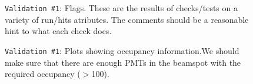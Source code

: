 \documentclass[12pt]{article}
\begin{document}
\begin{figure}
\centering
\noindent{}
  \caption{\centering \texttt{Validation \#1}: Flags. These are the results of checks/tests on a variety of run/hits atributes. The comments should be a reasonable hint to what each check does.}
  \label{fig:val7}
\end{figure}

\begin{figure}
\centering
\noindent{}
  \caption{\centering \texttt{Validation \#1}: Plots showing occupancy information.\hspace{\textwidth}We should make sure that there are enough PMTs in the beamspot with the required occupancy ($>$100).}
  \label{fig:val8}
\end{figure}
\end{document}
